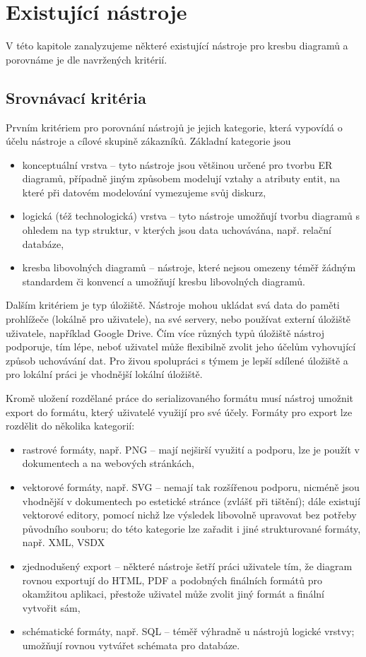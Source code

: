 \chapter{Existující nástroje}

V této kapitole zanalyzujeme některé existující nástroje pro kresbu diagramů a
porovnáme je dle navržených kritérií.

\section{Srovnávací kritéria}

Prvním kritériem pro porovnání nástrojů je jejich kategorie, která vypovídá o
účelu nástroje a cílové skupině zákazníků. Základní kategorie jsou
\begin{itemize}
  \item konceptuální vrstva -- tyto nástroje jsou většinou určené pro tvorbu ER
  diagramů, případně jiným způsobem modelují vztahy a atributy entit, na které
  při datovém modelování vymezujeme svůj diskurz,
  \item logická (též technologická) vrstva -- tyto nástroje umožňují tvorbu
  diagramů s ohledem na typ struktur, v kterých jsou data uchovávána, např.
  relační databáze,
  \item kresba libovolných diagramů -- nástroje, které nejsou omezeny téměř
  žádným standardem či konvencí a umožňují kresbu libovolných diagramů.
\end{itemize}

Dalším kritériem je typ úložiště. Nástroje mohou ukládat svá data do paměti
prohlížeče (lokálně pro uživatele), na své servery, nebo používat externí
úložiště uživatele, například Google Drive. Čím více různých typů úložiště
nástroj podporuje, tím lépe, neboť uživatel může flexibilně zvolit jeho účelům
vyhovující způsob uchovávání dat. Pro živou spolupráci s týmem je lepší sdílené
úložiště a pro lokální práci je vhodnější lokální úložiště.

Kromě uložení rozdělané práce do serializovaného formátu musí nástroj umožnit
export do formátu, který uživatelé využijí pro své účely. Formáty pro export lze
rozdělit do několika kategorií:
\begin{itemize}
  \item rastrové formáty, např. PNG -- mají nejširší využití a podporu, lze je
  použít v dokumentech a na webových stránkách,
  \item vektorové formáty, např. SVG -- nemají tak rozšířenou podporu, nicméně
  jsou vhodnější v dokumentech po estetické stránce (zvlášť při tištění); dále
  existují vektorové editory, pomocí nichž lze výsledek libovolně upravovat bez
  potřeby původního souboru; do této kategorie lze zařadit i jiné strukturované
  formáty, např. XML, VSDX
  \item zjednodušený export -- některé nástroje šetří práci uživatele tím, že
  diagram rovnou exportují do HTML, PDF a podobných finálních formátů pro
  okamžitou aplikaci, přestože uživatel může zvolit jiný formát a finální
  vytvořit sám,
  \item schématické formáty, např. SQL -- téměř výhradně u nástrojů logické
  vrstvy; umožňují rovnou vytvářet schémata pro databáze.
\end{itemize}

